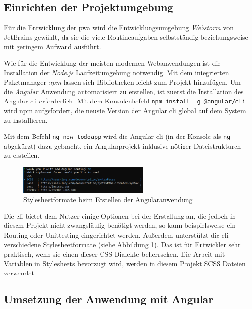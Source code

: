 \subsection{Einrichten der Projektumgebung}
Für die Entwicklung der \ac{pwa} wird die Entwicklungsumgebung \textit{Webstorm} von JetBrains gewählt, da sie die viele Routineaufgaben selbstständig beziehungsweise mit geringem Aufwand ausführt.

Wie für die Entwicklung der meisten modernen Webanwendungen ist die Installation der \textit{Node.js} Laufzeitumgebung notwendig. Mit dem integrierten Paketmanager \textit{npm} lassen sich Bibliotheken leicht zum Projekt hinzufügen.
Um die \textit{Angular} Anwendung automatisiert zu erstellen, ist zuerst die Installation des Angular \acf{cli} erforderlich. Mit dem Konsolenbefehl \texttt{npm install -g @angular/cli} wird npm aufgefordert, die neuste Version der Angular \ac{cli} global auf dem System zu installieren.


Mit dem Befehl \texttt{ng new todoapp} wird die Angular \ac{cli} (in der Konsole als \texttt{ng} abgekürzt) dazu gebracht, ein Angularprojekt inklusive nötiger Dateistrukturen zu erstellen.
\begin{figure}
	\vspace{-10pt}
	\includegraphics[width=0.58\textwidth]{img/angular_cli_css.PNG}
	\caption{Stylesheetformate beim Erstellen der Angularanwendung}
	\label{fig:stylesheet_formate_cli}
	\vspace{-10pt}
\end{figure}
Die \ac{cli} bietet dem Nutzer einige Optionen bei der Erstellung an, die jedoch in diesem Projekt nicht zwangsläufig benötigt werden, so kann beispielsweise ein Routing oder Unittesting eingerichtet werden.
Außerdem unterstützt die \ac{cli} verschiedene Stylesheetformate (siehe Abbildung \ref{fig:stylesheet_formate_cli}). Das ist für Entwickler sehr praktisch, wenn sie einen dieser CSS-Dialekte beherrschen. Die Arbeit mit Variablen in Stylesheets bevorzugt wird, werden in diesem Projekt SCSS Dateien verwendet.


\subsection{Umsetzung der Anwendung mit Angular}

